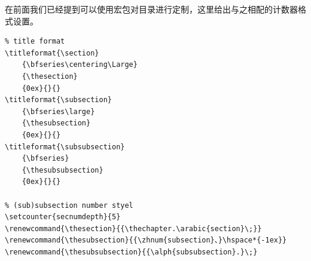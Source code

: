 在前面我们已经提到可以使用宏包对目录进行定制，这里给出与之相配的计数器格式设置。
\begin{verbatim}
% title format
\titleformat{\section}
    {\bfseries\centering\Large}
    {\thesection}
    {0ex}{}{}
\titleformat{\subsection}
    {\bfseries\large}
    {\thesubsection}
    {0ex}{}{}
\titleformat{\subsubsection}
    {\bfseries}
    {\thesubsubsection}
    {0ex}{}{}

% (sub)subsection number styel
\setcounter{secnumdepth}{5}
\renewcommand{\thesection}{{\thechapter.\arabic{section}\;}}
\renewcommand{\thesubsection}{{\zhnum{subsection}、}\hspace*{-1ex}}
\renewcommand{\thesubsubsection}{{\alph{subsubsection}.}\;}
\end{verbatim}

